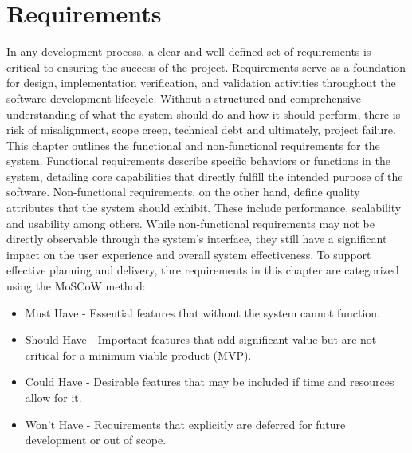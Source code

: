 \chapter{Requirements}
\label{chap:requirements}

In any development process, a clear and well-defined set of requirements is critical
to ensuring the success of the project. Requirements serve as a foundation for design, implementation
verification, and validation activities throughout the software development lifecycle.
Without a structured and comprehensive understanding of what the system should do and how it 
should perform, there is risk of misalignment, scope creep, technical debt and ultimately, 
project failure. This chapter outlines the functional and non-functional requirements for the 
system. Functional requirements describe specific behaviors or functions in the system, detailing
core capabilities that directly fulfill the intended purpose of the software.
Non-functional requirements, on the other hand, define quality attributes that the system
should exhibit. These include performance, scalability and usability among others. While
non-functional requirements may not be directly observable through the system's interface, they
still have a significant impact on the user experience and overall system effectiveness.
To support effective planning and delivery, thre requirements in this chapter are categorized 
using the MoSCoW method:
\begin{itemize}
    \item Must Have - Essential features that without the system cannot function.
    \item Should Have - Important features that add significant value but are not critical 
    for a minimum viable product (MVP).
    \item Could Have - Desirable features that may be included if time and resources allow for it.
    \item Won't Have - Requirements that explicitly are deferred for future development or out of scope.
\end{itemize}



